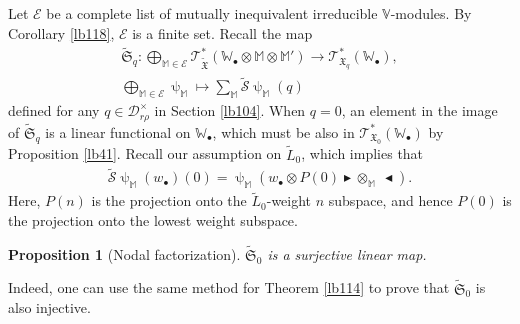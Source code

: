 \documentclass[12pt,a4paper,notitlepage]{report}
\theoremstyle{definition}
\theoremstyle{plain}
\newtheorem{pp}[df]{Proposition}
\newcommand{\fk}{\mathfrak}
\newcommand{\mc}{\mathcal}
\newcommand{\wtd}{\widetilde}
\newcommand{\scr}{\mathscr}
\newcommand{\blt}{\bullet}
\newcommand{\Vbb}{\mathbb V}
\newcommand{\Wbb}{\mathbb W}
\newcommand{\Mbb}{\mathbb M}
\newcommand{\btl}{\blacktriangleleft}
\newcommand{\btr}{\blacktriangleright}
\numberwithin{equation}{section}
\begin{document}
Let $\mc E$ be a complete list of mutually inequivalent irreducible $\Vbb$-modules.  By Corollary \ref{lb118}, $\mc E$ is a finite set. Recall the map
\begin{gather*}
\wtd{\fk S}_q:\bigoplus_{\Mbb\in\mc E}\scr T_{\wtd{\fk X}}^*(\Wbb_\blt\otimes\Mbb\otimes\Mbb')\rightarrow\scr T_{\fk X_q}^*(\Wbb_\blt),\\
\bigoplus_{\Mbb\in\mc E}\uppsi_\Mbb\mapsto\sum_{\Mbb}\wtd{\mc S}\uppsi_\Mbb(q)
\end{gather*}
defined for any $q\in\mc D_{r\rho}^\times$ in Section \ref{lb104}. When $q=0$, an element in the image of $\wtd{\fk S}_q$ is a linear functional on $\Wbb_\blt$, which must be also in $\scr T_{\fk X_0}^*(\Wbb_\blt)$ by Proposition \ref{lb41}.  Recall our assumption on $\wtd L_0$, which implies that
\begin{align*}
\wtd{\mc S}\uppsi_\Mbb(w_\blt)(0)=\uppsi_\Mbb(w_\blt\otimes P(0)\btr\otimes_\Mbb~\btl).
\end{align*}
Here, $P(n)$ is the projection onto the $\wtd L_0$-weight $n$ subspace, and hence $P(0)$ is the projection onto the lowest weight subspace.


\begin{pp}[Nodal factorization]\label{lb120}
$\wtd{\fk S}_0$ is a surjective linear map.
\end{pp}

Indeed, one can use the same method for Theorem \ref{lb114} to prove that $\wtd{\fk S}_0$ is also injective.
\end{document}
